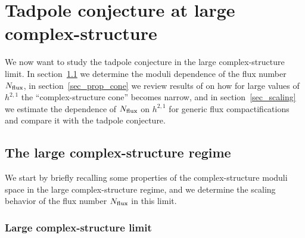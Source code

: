 \documentclass[12pt,a4paper]{article}
\numberwithin{equation}{section}
\begin{document}

\section{Tadpole conjecture at large complex-structure}
\label{sec_tad_cone}


We now want to study the tadpole conjecture in the large complex-structure 
limit. In section~\ref{sec_tad_lcs} we determine
the moduli dependence of the flux number $N_{\rm flux}$,
in section~\ref{sec_prop_cone} we review results of \cite{Demirtas:2018akl} on 
how for large values of $h^{2,1}$ the ``complex-structure cone''  becomes 
narrow, and in section~\ref{sec_scaling} we estimate the dependence of $N_{\rm flux}$ 
on $h^{2,1}$ for generic flux compactifications and compare it with the tadpole conjecture. 



\subsection{The large complex-structure regime}
\label{sec_tad_lcs}

We start by briefly recalling some properties of the complex-structure moduli 
space in the large complex-structure regime,
and we determine the scaling behavior of the flux number $N_{\rm flux}$ in 
this limit. 



\subsubsection*{Large complex-structure limit}
\end{document}
